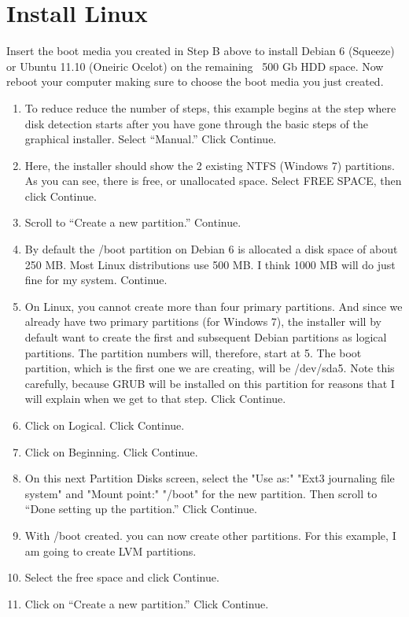 \documentclass[12pt,notitlepage,onecolumn,oneside,draft]{memoir}
\begin{document}
\chapter{Install Linux}
\newline
Insert the boot media you created in Step B above to install Debian 6 (Squeeze) or Ubuntu 11.10 (Oneiric Ocelot) on the remaining ~500 Gb HDD space.  Now reboot your computer making sure to choose the boot media you just created.
\newline
\begin{enumerate}
\item To reduce reduce the number of steps, this example begins at the step where disk detection starts after you have gone through the basic steps of the graphical installer. 
Select “Manual.”  Click Continue. 
\item Here, the installer should show the 2 existing NTFS (Windows 7) partitions. As you can see, there is free, or unallocated space. Select FREE SPACE, then click Continue. 
\item Scroll to “Create a new partition.” Continue. 
\item By default the /boot partition on Debian 6 is allocated a disk space of about 250 MB. Most Linux distributions use 500 MB. I think 1000 MB will do just fine for my system. Continue. 
\item On Linux, you cannot create more than four primary partitions. And since we already have two primary partitions (for Windows 7), the installer will by default want to create the first and subsequent Debian partitions as logical partitions. The partition numbers will, therefore, start at 5. The boot partition, which is the first one we are creating, will be /dev/sda5. Note this carefully, because GRUB will be installed on this partition for reasons that I will explain when we get to that step. Click Continue. 
\item Click on Logical. Click Continue. 
\item Click on Beginning. Click Continue. 
\item On this next Partition Disks screen, select the "Use as:" "Ext3 journaling file system" and "Mount point:" "/boot" for the new partition. Then scroll to “Done setting up the partition.” Click Continue. 
\item With /boot created. you can now create other partitions. For this example, I am going to create LVM partitions. 
\item Select the free space and click Continue. 
\item Click on “Create a new partition.” Click Continue. 

\end{enumerate}
\end{document}
